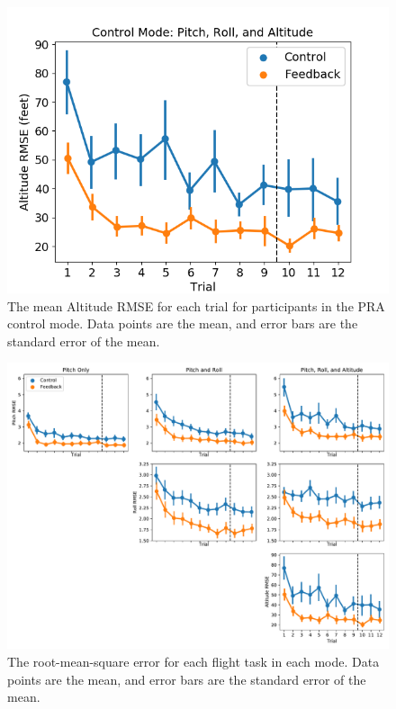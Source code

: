 \begin{figure}[tbp]
    \begin{center}
        \includegraphics[width=0.8\linewidth]{figures/Aircraft/image5.png}
        \caption[The mean Altitude RMSE for each trial]{The mean Altitude RMSE for each trial for participants in the PRA control mode. Data points are the mean, and error bars are the standard error of the mean.}
        \label{figure-hfes:altitudermse}
    \end{center}
\end{figure}

\begin{figure}[tb]
    \begin{center}
        \includegraphics[width=\linewidth]{figures/Aircraft/performance_measures.pdf}
        \caption[The root-mean-square error for each flight task in each mode]{The root-mean-square error for each flight task in each mode. Data points are the mean, and error bars are the standard error of the mean.}
        \label{figure-hfes:completermse}
    \end{center}
\end{figure}

